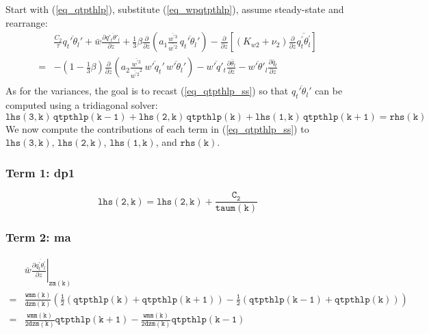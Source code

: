 \documentclass[11pt,fleqn]{article}
\newcommand{\ptlder}[2]{\frac{\partial #1}{\partial #2}}
\begin{document}
Start with (\ref{eq_qtpthlp}), substitute (\ref{eq_wpqtpthlp}), assume steady-state 
and rearrange:
%
\begin{equation}
\label{eq_qtpthlp_ss}
\begin{split}
& \frac{C_2}{\tau} \overline{q_t' \theta_l'}
+ \bar{w}\ptlder{\overline{q'_t\theta'_l}}{z}
+ \frac{1}{3} \beta
   \ptlder{}{z}
     \left( 
       a_1
       \frac{\overline{w^{'3}}}{\overline{w^{'2}}} \,
       \overline{q_t'\theta_l'}
     \right)
- \ptlder{}{z} \left[ \left( K_{w2} + \nu_2 \right)
                      \ptlder{}{z} \overline{q_t^{'}\theta_l^{'}}
               \right]  \\
=& 
   - \left( 1 - \frac{1}{3}\beta \right)
      \ptlder{}{z}
        \left( 
          a_2
          \frac{\overline{w^{'3}}}{\overline{w^{'2}}^2} \,
          \overline{w'q_t'} \, \overline{w'\theta_l'}
        \right)
   - \overline{w'q'_t}\ptlder{\bar{\theta}_l}{z} 
   - \overline{w'\theta'_l}\ptlder{\bar{q}_t}{z} \\
\end{split}
\end{equation}
%
As for the variances, the goal is to recast (\ref{eq_qtpthlp_ss}) so that 
$\overline{q_t'\theta_l'}$ can be computed using a tridiagonal solver:
%
\begin{equation}
\mathtt{ lhs(3,k) \, qtpthlp(k-1) + lhs(2,k) \, qtpthlp(k) + lhs(1,k) \, qtpthlp(k+1) = rhs(k) }
\end{equation}
%
We now compute the contributions of each term in (\ref{eq_qtpthlp_ss}) to
$\mathtt{lhs(3,k)}$, $\mathtt{lhs(2,k)}$, $\mathtt{lhs(1,k)}$, 
and $\mathtt{rhs(k)}$.

\subsubsection{Term 1:  dp1}

\begin{equation}
\mathtt{ lhs(2,k) = lhs(2,k) + \frac{C_2}{taum(k)} }
\end{equation}

\subsubsection{Term 2:  ma}

\begin{equation}
\begin{split}
& \left. \bar{w}\ptlder{\overline{q_t^{'}\theta_l^{'}}}{z} \right|_{\mathtt{zm(k)}} \\
=& \mathtt{ \frac{wmm(k)}{dzm(k)}
   \left(
     \frac{1}{2} \left( qtpthlp(k)+qtpthlp(k+1) \right)
     - \frac{1}{2} \left( qtpthlp(k-1)+qtpthlp(k) \right)
   \right) } \\
=& \mathtt{ \frac{wmm(k)}{2 dzm(k)} qtpthlp(k+1) - \frac{wmm(k)}{2 dzm(k)} qtpthlp(k-1) }
\end{split}
\end{equation}
\end{document}
